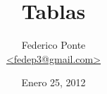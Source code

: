 \documentclass[11pt,fleqn]{article}
\begin{document}
\title{Tablas}
\author{Federico Ponte\\
\href{mailto:fedep3@gmail.com}{<fedep3@gmail.com>}}

\date{Enero 25, 2012}
\maketitle




















\end{document}
